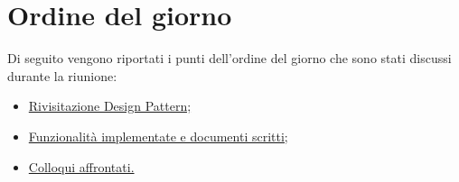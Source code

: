 \clearpage
\section{Ordine del giorno}
Di seguito vengono riportati i punti dell’ordine del giorno che sono stati discussi durante la riunione:
\begin{itemize}
	\item \hyperref[sec:pattern]{Rivisitazione Design Pattern;}
	\item \hyperref[sec:funzionalità]{Funzionalità implementate e documenti scritti;}
	\item \hyperref[sec:colloquio]{Colloqui affrontati.}
\end{itemize}